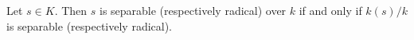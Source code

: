 Let $s \in K$. Then $s$ is separable (respectively radical) over $k$ if and only if $k(s)/k$ is separable (respectively radical).
